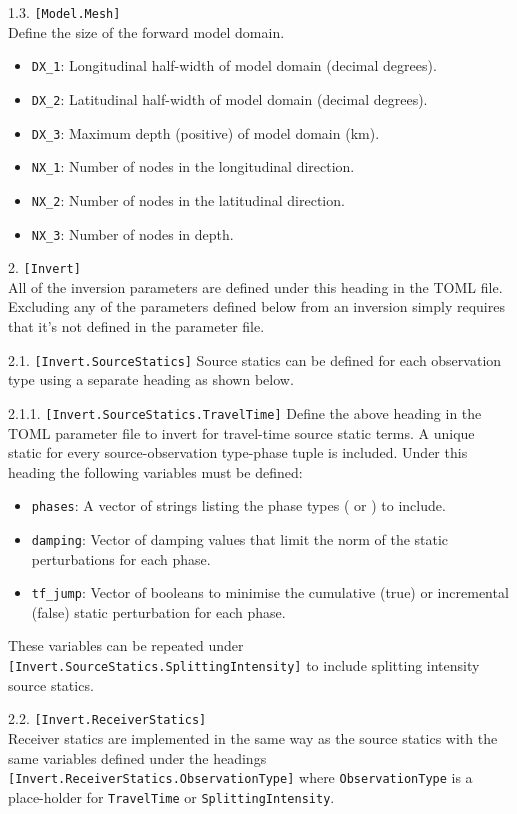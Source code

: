 1.3. \texttt{[Model.Mesh]}\\
Define the size of the forward model domain.
\begin{itemize}
\item \texttt{DX\_1}: Longitudinal half-width of model domain (decimal degrees).
\item \texttt{DX\_2}: Latitudinal half-width of model domain (decimal degrees).
\item \texttt{DX\_3}: Maximum depth (positive) of model domain (km).
\item \texttt{NX\_1}: Number of nodes in the longitudinal direction.
\item \texttt{NX\_2}: Number of nodes in the latitudinal direction.
\item \texttt{NX\_3}: Number of nodes in depth.
\end{itemize}

2. \texttt{[Invert]}\\
All of the inversion parameters are defined under this heading in the TOML file. Excluding any of the parameters defined below from an inversion simply requires that it's not defined in the parameter file.

2.1. \texttt{[Invert.SourceStatics]}
Source statics can be defined for each observation type using a separate heading as shown below.

2.1.1. \texttt{[Invert.SourceStatics.TravelTime]}
Define the above heading in the TOML parameter file to invert for travel-time source static terms. A unique static for every source-observation type-phase tuple is included. Under this heading the following variables must be defined:
\begin{itemize}
\item \texttt{phases}: A vector of strings listing the phase types ( or ) to include.
\item \texttt{damping}: Vector of damping values that limit the norm of the static perturbations for each phase.
\item \texttt{tf\_jump}: Vector of booleans to minimise the cumulative (true) or incremental (false) static perturbation for each phase.
\end{itemize}

These variables can be repeated under \texttt{[Invert.SourceStatics.SplittingIntensity]} to include splitting intensity source statics. 


2.2. \texttt{[Invert.ReceiverStatics]}\\
Receiver statics are implemented in the same way as the source statics with the same variables defined under the headings \texttt{[Invert.ReceiverStatics.ObservationType]} where \texttt{ObservationType} is a place-holder for \texttt{TravelTime} or \texttt{SplittingIntensity}.

